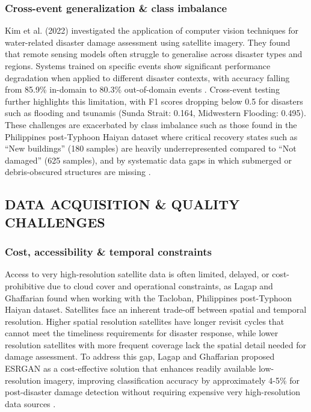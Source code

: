 \documentclass[conference,a4paper]{IEEEtran}
\begin{document}
\subsubsection{Cross-event generalization \& class imbalance}
Kim et al. (2022) investigated the application of computer vision techniques for water-related disaster damage assessment using satellite imagery. They found that remote sensing models often struggle to generalise across disaster types and regions. Systems trained on specific events show significant performance degradation when applied to different disaster contexts, with accuracy falling from 85.9\% in-domain to 80.3\% out-of-domain events \cite{kimDisasterAssessmentUsing2022}. Cross-event testing further highlights this limitation, with F1 scores dropping below 0.5 for disasters such as flooding and tsunamis (Sunda Strait: 0.164, Midwestern Flooding: 0.495). These challenges are exacerbated by class imbalance such as those found in the Philippines post-Typhoon Haiyan dataset where critical recovery states such as ``New buildings'' (180 samples) are heavily underrepresented compared to ``Not damaged'' (625 samples), and by systematic data gaps in which submerged or debris-obscured structures are missing \cite{lagapEnhancingPostDisasterDamage2025}.


\subsection{DATA ACQUISITION \& QUALITY CHALLENGES}

\subsubsection{Cost, accessibility \& temporal constraints}
Access to very high-resolution satellite data is often limited, delayed, or cost-prohibitive due to cloud cover and operational constraints, as Lagap and Ghaffarian found when working with the Tacloban, Philippines post-Typhoon Haiyan dataset. Satellites face an inherent trade-off between spatial and temporal resolution. Higher spatial resolution satellites have longer revisit cycles that cannot meet the timeliness requirements for disaster response, while lower resolution satellites with more frequent coverage lack the spatial detail needed for damage assessment. To address this gap, Lagap and Ghaffarian proposed ESRGAN as a cost-effective solution that enhances readily available low-resolution imagery, improving classification accuracy by approximately 4-5\% for post-disaster damage detection without requiring expensive very high-resolution data sources \cite{lagapEnhancingPostDisasterDamage2025}.
\end{document}
